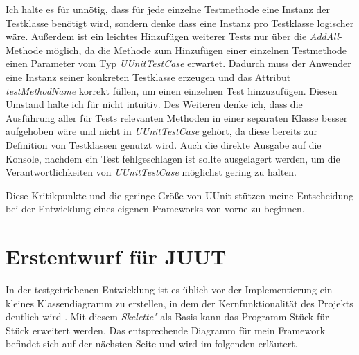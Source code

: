 Ich halte es für unnötig, dass für jede einzelne Testmethode eine Instanz der Testklasse benötigt wird, sondern denke dass eine Instanz pro Testklasse logischer wäre. Außerdem ist ein leichtes Hinzufügen weiterer Tests nur über die \textit{AddAll}-Methode möglich, da die Methode zum Hinzufügen einer einzelnen Testmethode einen Parameter vom Typ \textit{UUnitTestCase} erwartet. Dadurch muss der Anwender eine Instanz seiner konkreten Testklasse erzeugen und das Attribut \textit{testMethodName} korrekt füllen, um einen einzelnen Test hinzuzufügen. Diesen Umstand halte ich für nicht intuitiv. Des Weiteren denke ich, dass die Ausführung aller für Tests relevanten Methoden in einer separaten Klasse besser aufgehoben wäre und nicht in \textit{UUnitTestCase} gehört, da diese bereits zur Definition von Testklassen genutzt wird. Auch die direkte Ausgabe auf die Konsole, nachdem ein Test fehlgeschlagen ist sollte ausgelagert werden, um die Verantwortlichkeiten von \textit{UUnitTestCase} möglichst gering zu halten.

Diese Kritikpunkte und die geringe Größe von UUnit stützen meine Entscheidung bei der Entwicklung eines eigenen Frameworks von vorne zu beginnen.

\section{Erstentwurf für JUUT}

In der testgetriebenen Entwicklung ist es üblich vor der Implementierung ein kleines Klassendiagramm zu erstellen, in dem der Kernfunktionalität des Projekts deutlich wird \cite[Seite 32-37]{FRE10}. Mit diesem \textit{\glqq Skelette"} als Basis kann das Programm Stück für Stück erweitert werden. Das entsprechende Diagramm für mein Framework befindet sich auf der nächsten Seite und wird im folgenden erläutert.
\pagebreak

